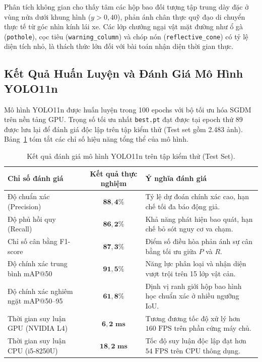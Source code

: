 Phân tích không gian cho thấy tâm các hộp bao đối tượng tập trung dày đặc ở vùng nửa dưới khung hình ($y > 0,40$), phản ánh chân thực quỹ đạo di chuyển thực tế từ góc nhìn kính lái xe. Các lớp chướng ngại vật mặt đường như ổ gà (\texttt{pothole}), cọc tiêu (\texttt{warning\_column}) và chóp nón (\texttt{reflective\_cone}) có tỷ lệ diện tích nhỏ, là thách thức lớn đối với bài toán nhận diện thời gian thực.

\subsection{Kết Quả Huấn Luyện và Đánh Giá Mô Hình YOLO11n}
\label{subsec:ket_qua_huan_luyen_yolo11n}

Mô hình YOLO11n được huấn luyện trong 100 epochs với bộ tối ưu hóa SGDM trên nền tảng GPU. Trọng số tối ưu nhất \texttt{best.pt} đạt được tại epoch thứ 89 được lưu lại để đánh giá độc lập trên tập kiểm thử (Test set gồm 2.483 ảnh). Bảng~\ref{tab:test_metrics_overall} tóm tắt các chỉ số hiệu năng tổng thể của mô hình.

\begin{table}[htbp]
\centering
\caption{Kết quả đánh giá mô hình YOLO11n trên tập kiểm thử (Test Set).}
\label{tab:test_metrics_overall}
\begin{tabular}{|l|c|p{7.5cm}|}
\hline
\textbf{Chỉ số đánh giá} & \textbf{Kết quả thực nghiệm} & \textbf{Ý nghĩa đánh giá} \\ \hline
Độ chuẩn xác (Precision) & $\mathbf{88,4\%}$ & Tỷ lệ dự đoán chính xác cao, hạn chế tối đa báo động giả. \\ \hline
Độ phủ hồi quy (Recall) & $\mathbf{86,2\%}$ & Khả năng phát hiện bao quát, hạn chế bỏ sót nguy cơ va chạm. \\ \hline
Chỉ số cân bằng F1-score & $\mathbf{87,3\%}$ & Điểm số điều hòa phản ánh sự cân bằng tối ưu giữa $P$ và $R$. \\ \hline
Độ chính xác trung bình mAP@50 & $\mathbf{91,5\%}$ & Năng lực phân loại và nhận diện vượt trội trên 15 lớp vật cản. \\ \hline
Độ chính xác nghiêm ngặt mAP@50--95 & $\mathbf{61,8\%}$ & Định vị ranh giới hộp bao hình học chuẩn xác ở nhiều ngưỡng IoU. \\ \hline
Thời gian suy luận GPU (NVIDIA L4) & $\mathbf{6,2\text{ ms}}$ & Tương đương tốc độ xử lý hơn $160\text{ FPS}$ trên phần cứng máy chủ. \\ \hline
Thời gian suy luận CPU (i5-8250U) & $\mathbf{18,2\text{ ms}}$ & Tốc độ suy luận độc lập đạt hơn $54\text{ FPS}$ trên CPU thông dụng. \\ \hline
\end{tabular}
\end{table}

